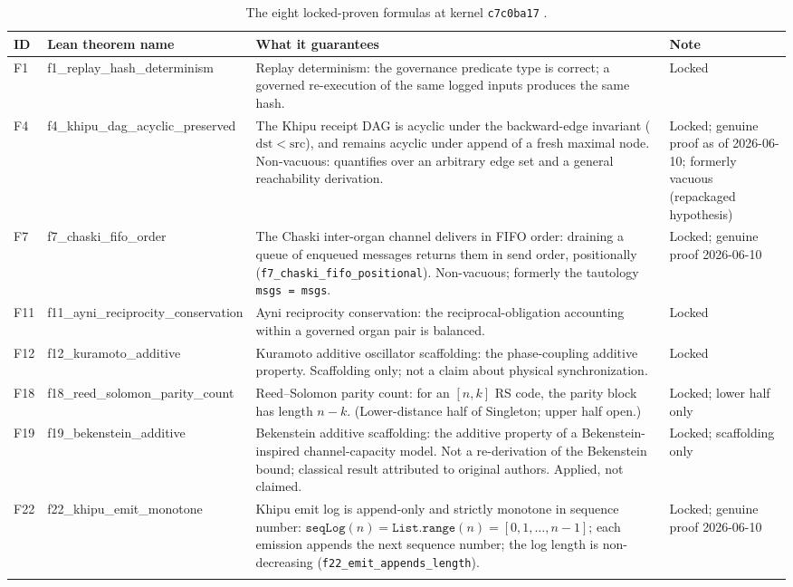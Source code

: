 \documentclass[11pt,letterpaper]{article}
\newcommand{\lean}[1]{{\small\ttfamily #1}}
\newcommand{\lb}{\discretionary{}{}{}}
\theoremstyle{definition}
\begin{document}
\begin{longtable}{@{}p{0.55cm}p{4.0cm}p{5.3cm}p{2.35cm}@{}}
\toprule
\textbf{ID} & \textbf{Lean theorem name} & \textbf{What it guarantees}
  & \textbf{Note} \\
\midrule
\endhead
F1  & \lean{f1\_\lb replay\_\lb hash\_\lb determinism}
    & Replay determinism: the governance predicate type is correct; a governed
      re-execution of the same logged inputs produces the same hash.
    & Locked \\
\addlinespace
F4  & \lean{f4\_\lb khipu\_\lb dag\_\lb acyclic\_\lb preserved}
    & The Khipu receipt DAG is acyclic under the backward-edge invariant
      ($\mathrm{dst} < \mathrm{src}$), and remains acyclic under append of a
      fresh maximal node.  Non-vacuous: quantifies over an arbitrary edge set
      and a general reachability derivation.
    & Locked; genuine proof as of 2026-06-10; formerly vacuous (repackaged
      hypothesis) \\
\addlinespace
F7  & \lean{f7\_\lb chaski\_\lb fifo\_\lb order}
    & The Chaski inter-organ channel delivers in FIFO order: draining a queue
      of enqueued messages returns them in send order, positionally
      (\texttt{f7\_chaski\_fifo\_positional}).  Non-vacuous; formerly the
      tautology \texttt{msgs = msgs}.
    & Locked; genuine proof 2026-06-10 \\
\addlinespace
F11 & \lean{f11\_\lb ayni\_\lb reciprocity\_\lb conservation}
    & Ayni reciprocity conservation: the reciprocal-obligation accounting
      within a governed organ pair is balanced.
    & Locked \\
\addlinespace
F12 & \lean{f12\_\lb kuramoto\_\lb additive}
    & Kuramoto additive oscillator scaffolding: the phase-coupling additive
      property.  Scaffolding only; not a claim about physical synchronization.
    & Locked \\
\addlinespace
F18 & \lean{f18\_\lb reed\_\lb solomon\_\lb parity\_\lb count}
    & Reed--Solomon parity count: for an $[n,k]$ RS code, the parity block
      has length $n-k$.  (Lower-distance half of Singleton; upper half open.)
    & Locked; lower half only \\
\addlinespace
F19 & \lean{f19\_\lb bekenstein\_\lb additive}
    & Bekenstein additive scaffolding: the additive property of a
      Bekenstein-inspired channel-capacity model.  Not a re-derivation of the
      Bekenstein bound; classical result attributed to original authors.
      Applied, not claimed.
    & Locked; scaffolding only \\
\addlinespace
F22 & \lean{f22\_\lb khipu\_\lb emit\_\lb monotone}
    & Khipu emit log is append-only and strictly monotone in sequence number:
      $\texttt{seqLog}(n) = \texttt{List.range}(n) = [0,1,\dots,n-1]$;
      each emission appends the next sequence number; the log length is
      non-decreasing (\texttt{f22\_emit\_appends\_length}).
    & Locked; genuine proof 2026-06-10 \\
\bottomrule
\caption{The eight locked-proven formulas at kernel \texttt{c7c0ba17}%
  \cite{szl_v26,lutarlean}.}
\label{tab:locked8}
\end{longtable}
\end{document}
